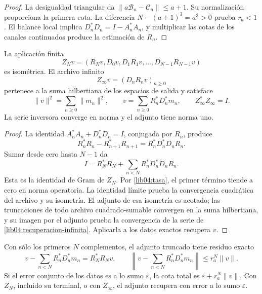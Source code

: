 \begin{proof}
La desigualdad triangular da
\(\|a\mathcal B_n-\mathcal C_n\|\leq a+1\). Su normalización
proporciona la primera cota. La diferencia
\(N-(a+1)^3=a^3>0\) prueba \(r_a<1\). El balance local implica
\(D_n^*D_n=I-A_n^*A_n\), y multiplicar las cotas de los canales
continuados produce la estimación de \(R_n\).
\end{proof}

\begin{theorem}
\label{lib04:teo-archivo}
La aplicación finita
\begin{equation}
 Z_Nv=(R_Nv,D_0v,D_1R_1v,\ldots,D_{N-1}R_{N-1}v)
 \label{lib04:zn}
\end{equation}
es isométrica. El archivo infinito
\begin{equation}
 Z_\infty v=(D_nR_nv)_{n\geq0}
 \label{lib04:zinfty}
\end{equation}
pertenece a la suma hilbertiana de los espacios de salida y satisface
\begin{equation}
 \|v\|^2=\sum_{n\geq0}\|m_n\|^2,\qquad
 v=\sum_{n\geq0}R_n^*D_n^*m_n,
 \qquad Z_\infty^*Z_\infty=I.
 \label{lib04:recuperacion-infinita}
\end{equation}
La serie inversora converge en norma y el adjunto tiene norma uno.
\end{theorem}

\begin{proof}
La identidad \(A_n^*A_n+D_n^*D_n=I\), conjugada por \(R_n\),
produce
\[
 R_n^*R_n-R_{n+1}^*R_{n+1}=R_n^*D_n^*D_nR_n.
\]
Sumar desde cero hasta \(N-1\) da
\begin{equation}
 I=R_N^*R_N+\sum_{n<N}R_n^*D_n^*D_nR_n.
 \label{lib04:telescopia}
\end{equation}
Esta es la identidad de Gram de \(Z_N\). Por
\eqref{lib04:tasa}, el primer término tiende a cero en norma
operatoria. La identidad límite prueba la convergencia cuadrática del
archivo y su isometría. El adjunto de esa isometría es acotado; las
truncaciones de todo archivo cuadrado-sumable convergen en la suma
hilbertiana, y su imagen por el adjunto prueba la convergencia de la
serie de \eqref{lib04:recuperacion-infinita}. Aplicarla a los datos
exactos recupera \(v\).
\end{proof}

Con sólo los primeros \(N\) complementos, el adjunto truncado tiene
residuo exacto
\begin{equation}
 v-\sum_{n<N}R_n^*D_n^*m_n=R_N^*R_Nv,
 \qquad
 \left\|v-\sum_{n<N}R_n^*D_n^*m_n\right\|
 \leq r_a^N\|v\|.
 \label{lib04:sesgo-truncado}
\end{equation}
Si el error conjunto de los datos es a lo sumo \(\varepsilon\), la
cota total es \(\varepsilon+r_a^N\|v\|\). Con \(Z_N\), incluido
su terminal, o con \(Z_\infty\), el adjunto recupera con error a lo
sumo \(\varepsilon\).


